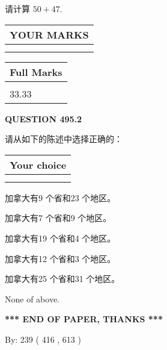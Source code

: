 \documentclass{ctexart}
\begin{document}
  
 
请计算 $ %
50 +  %
47 $.
 

 

 
  
\vspace{0.2in}
  
\noindent\begin{tabular}{|l|}
\hline
 YOUR MARKS  \\
\hline
 \\ 
 \\ 
\hline
\end{tabular}
\hspace{0.05in} \begin{tabular}{|l|}
\hline
 Full Marks  \\
\hline
 \\ 
33.33 \\
\hline
\end{tabular}
{\textbf{\Large{QUESTION
495.2 
}}}
  
  
请从如下的陈述中选择正确的：
  
  
\noindent\hspace{3.0in} \begin{tabular}{|l|}
\hline
Your choice \\
\hline
 \\ 
 \\ 
\hline
\end{tabular}
  
  
 
 
加拿大有9 个省和23 个地区。
 
 
加拿大有7 个省和9 个地区。
 
 
加拿大有19 个省和4 个地区。
 
 
加拿大有12 个省和3 个地区。
 
 
加拿大有25 个省和31 个地区。
 
 
 None of above.
 
 
   
   
 \vspace{0.2in}
 
   
   
   
   
\vspace{1.0in} 
{\textbf{\large{ *** END OF PAPER, THANKS *** }}} 
   
   
\hspace{1.0in} By: 
 239 ( 416 ,  613 )
   
\end{document}
